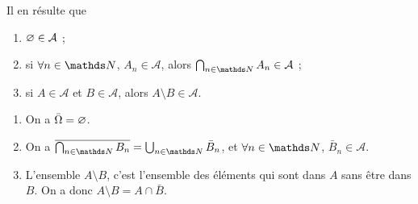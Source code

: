 \begin{prop}
	Il en résulte que
	\begin{enumerate}
		\item $\varnothing \in \mathcal{A}$\/ ;
		\item si $\forall n \in \N$, $A_n \in \mathcal{A}$, alors $\bigcap_{n \in \N} A_n \in \mathcal{A}$\/ ;
		\item si $A \in \mathcal{A}$\/ et $B \in \mathcal{A}$, alors $A \setminus B \in \mathcal{A}$.
	\end{enumerate}
\end{prop}

\begin{prv}
	\begin{enumerate}
		\item On a $\bar\Omega = \varnothing$.
		\item On a $\overline{\bigcap_{n \in \N} B_n} = \bigcup_{n \in \N} \bar{B}_n$, et $\forall n \in \N$, $\bar{B}_n \in \mathcal{A}$.
		\item L'ensemble $A \setminus B$, c'est l'ensemble des éléments qui sont dans $A$\/ sans être dans $B$. On a donc $A \setminus B = A \cap \bar{B}$.
	\end{enumerate}
\end{prv}

